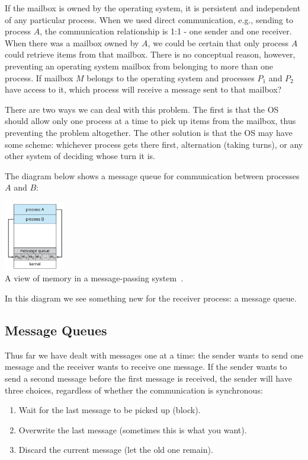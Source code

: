If the mailbox is owned by the operating system, it is persistent and independent of any particular process. When we used direct communication, e.g., sending to process $A$, the communication relationship is 1:1 - one sender and one receiver. When there was a mailbox owned by $A$, we could be certain that only process $A$ could retrieve items from that mailbox. There is no conceptual reason, however, preventing an operating system mailbox from belonging to more than one process. If mailbox $M$ belongs to the operating system and processes $P_{1}$ and $P_{2}$ have access to it, which process will receive a message sent to that mailbox?

There are two ways we can deal with this problem. The first is that the OS should allow only one process at a time to pick up items from the mailbox, thus preventing the problem altogether. The other solution is that the OS may have some scheme: whichever process gets there first, alternation (taking turns), or any other system of deciding whose turn it is.

The diagram below shows a message queue for communication between processes $A$ and $B$:
\begin{center}
	\includegraphics[width=0.2\textwidth]{images/message-passing.png}\\
	A view of memory in a message-passing system~\cite{osc}.
\end{center}

In this diagram we see something new for the receiver process: a message queue.

\subsection*{Message Queues}

Thus far we have dealt with messages one at a time: the sender wants to send one message and the receiver wants to receive one message. If the sender wants to send a second message before the first message is received, the sender will have three choices, regardless of whether the communication is synchronous:

\begin{enumerate}
	\item Wait for the last message to be picked up (block).
	\item Overwrite the last message (sometimes this is what you want).
	\item Discard the current message (let the old one remain).
\end{enumerate}

